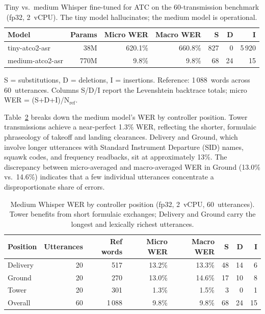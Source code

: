 \begin{table}[htbp]
\caption{Tiny vs.\ medium Whisper fine-tuned for ATC on the 60-transmission
benchmark (fp32, 2~vCPU). The tiny model hallucinates; the medium model is
operational.}
\label{tab:model_comparison}
\centering
\begin{tabular}{lrrrrrr}
\toprule
Model & Params & Micro WER & Macro WER & S & D & I \\
\midrule
tiny-atco2-asr   & 38M  & 620.1\% & 660.8\% & 827  & 0     & 5\,920 \\
medium-atco2-asr & 770M & 9.8\%   & 9.8\%   & 68   & 24    & 15     \\
\bottomrule
\end{tabular}
\par\bigskip
\footnotesize S = substitutions, D = deletions, I = insertions. Reference: 1\,088~words across 60~utterances. Columns S/D/I report the Levenshtein backtrace totals; micro WER = (S+D+I)/N$_{\mathrm{ref}}$.
\end{table}

Table~\ref{tab:summary_medium} breaks down the medium model's WER by controller
position. Tower transmissions achieve a near-perfect 1.3\% WER, reflecting the
shorter, formulaic phraseology of takeoff and landing clearances. Delivery and
Ground, which involve longer utterances with Standard Instrument Departure (SID)
names, squawk codes, and frequency readbacks, sit at approximately 13\%. The
discrepancy between micro-averaged and macro-averaged WER in Ground (13.0\% vs.\
14.6\%) indicates that a few individual utterances concentrate a disproportionate
share of errors.

\begin{table}[htbp]
\caption{Medium Whisper WER by controller position (fp32, 2~vCPU, 60~utterances). Tower benefits from short formulaic exchanges; Delivery and Ground carry the longest and lexically richest utterances.}
\label{tab:summary_medium}
\centering
\begin{tabular}{lrrrrrrr}
\toprule
Position  & Utterances & Ref words & Micro WER & Macro WER & S  & D  & I \\
\midrule
Delivery  & 20 & 517 & 13.2\% & 13.3\% & 48 & 14 & 6 \\
Ground    & 20 & 270 & 13.0\% & 14.6\% & 17 & 10 & 8 \\
Tower     & 20 & 301 & 1.3\%  & 1.5\%  & 3  & 0  & 1 \\
\midrule
Overall   & 60 & 1\,088 & 9.8\% & 9.8\% & 68 & 24 & 15 \\
\bottomrule
\end{tabular}
\end{table}

